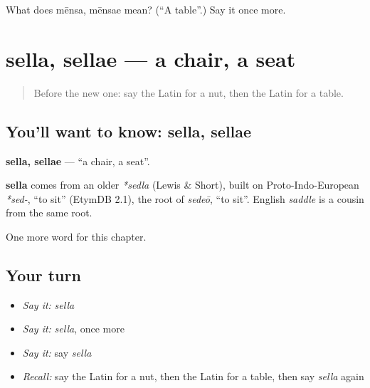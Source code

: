 \begin{tcolorbox}[breakable,colback=teal!4,colframe=teal!35!black,title={Before you move on}]
What does mēnsa, mēnsae mean? (\textquotedblleft{}A table\textquotedblright{}.) Say it once more.
\end{tcolorbox}
\section[sella, sellae]{sella, sellae — a chair, a seat}

\label{lesson:LA-C82-sella}



\begin{quote}
Before the new one: say the Latin for a nut, then the Latin for a table.
\end{quote}

\subsection*{You'll want to know: sella, sellae}
\textbf{sella, sellae} — \textquotedblleft{}a chair, a seat\textquotedblright{}.

\begin{cousinweb}
\textbf{sella} comes from an older \emph{*sedla} (Lewis \& Short), built on Proto-Indo-European \emph{*sed-}, \textquotedblleft{}to sit\textquotedblright{} (EtymDB 2.1), the root of \emph{sedeō}, \textquotedblleft{}to sit\textquotedblright{}. English \emph{saddle} is a cousin from the same root.
\end{cousinweb}

\begin{grammarlens}[title={What you've built}]
One more word for this chapter.
\end{grammarlens}

\subsection*{Your turn}
\begin{itemize}
\raggedright
  \item \emph{Say it:} \emph{sella}
  \item \emph{Say it:} \emph{sella}, once more
  \item \emph{Say it:} say \emph{sella}
  \item \emph{Recall:} say the Latin for a nut, then the Latin for a table, then say \emph{sella} again
\end{itemize}

